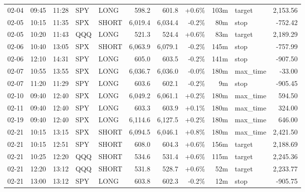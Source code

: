 \documentclass[11pt,a4paper,twoside]{article}
\begin{document}
\begin{center}
\begin{longtable}{>{\color{txtmain}}l l l l l r r r r >{\color{txtmain}}l r}
02-04 & 09:45 & 11:28 & SPY & LONG & 598.2 & 601.8 & \textcolor{wingreen}{+0.6\%} & 103m & target & \textcolor{wingreen}{2,153.56} \\
02-05 & 10:15 & 11:35 & SPX & SHORT & 6,019.4 & 6,034.4 & \textcolor{lossred}{-0.2\%} & 80m & stop & \textcolor{lossred}{-752.42} \\
02-05 & 10:20 & 11:43 & QQQ & LONG & 521.3 & 524.4 & \textcolor{wingreen}{+0.6\%} & 83m & target & \textcolor{wingreen}{2,189.29} \\
02-06 & 10:40 & 13:05 & SPX & SHORT & 6,063.9 & 6,079.1 & \textcolor{lossred}{-0.2\%} & 145m & stop & \textcolor{lossred}{-757.99} \\
02-06 & 12:10 & 14:31 & SPY & LONG & 605.0 & 603.5 & \textcolor{lossred}{-0.2\%} & 141m & stop & \textcolor{lossred}{-907.50} \\
02-07 & 10:55 & 13:55 & SPX & LONG & 6,036.7 & 6,036.0 & \textcolor{lossred}{-0.0\%} & 180m & max\_time & \textcolor{lossred}{-33.00} \\
02-07 & 11:20 & 11:29 & SPY & LONG & 603.6 & 602.1 & \textcolor{lossred}{-0.2\%} & 9m & stop & \textcolor{lossred}{-905.45} \\
02-10 & 09:40 & 12:40 & SPX & LONG & 6,049.2 & 6,061.1 & \textcolor{wingreen}{+0.2\%} & 180m & max\_time & \textcolor{wingreen}{594.50} \\
02-11 & 09:40 & 12:40 & SPY & LONG & 603.3 & 603.9 & \textcolor{wingreen}{+0.1\%} & 180m & max\_time & \textcolor{wingreen}{324.00} \\
02-19 & 09:40 & 12:40 & SPX & LONG & 6,114.6 & 6,127.5 & \textcolor{wingreen}{+0.2\%} & 180m & max\_time & \textcolor{wingreen}{646.00} \\
02-21 & 10:15 & 13:15 & SPX & SHORT & 6,094.5 & 6,046.1 & \textcolor{wingreen}{+0.8\%} & 180m & max\_time & \textcolor{wingreen}{2,421.50} \\
02-21 & 10:15 & 12:51 & SPY & SHORT & 608.0 & 604.3 & \textcolor{wingreen}{+0.6\%} & 156m & target & \textcolor{wingreen}{2,188.69} \\
02-21 & 10:25 & 12:20 & QQQ & SHORT & 534.6 & 531.4 & \textcolor{wingreen}{+0.6\%} & 115m & target & \textcolor{wingreen}{2,245.36} \\
02-21 & 12:20 & 13:12 & QQQ & SHORT & 531.8 & 528.7 & \textcolor{wingreen}{+0.6\%} & 52m & target & \textcolor{wingreen}{2,233.77} \\
02-21 & 13:00 & 13:12 & SPY & LONG & 603.8 & 602.3 & \textcolor{lossred}{-0.2\%} & 12m & stop & \textcolor{lossred}{-905.75} \\

\end{longtable}
\end{center}
\end{document}
